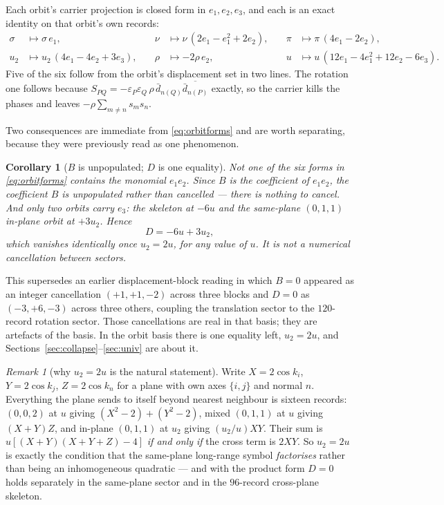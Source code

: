 \documentclass[11pt]{article}
\newtheorem{corollary}[theorem]{Corollary}
\theoremstyle{definition}
\theoremstyle{remark}
\newtheorem{remark}[theorem]{Remark}
\newcommand{\chk}[1]{}
\begin{document}
Each orbit's carrier projection is closed form in $e_1,e_2,e_3$, and each is an
exact identity on that orbit's own records:
\begin{equation}\label{eq:orbitforms}
\begin{aligned}
  \sigma&\longmapsto \sigma\,e_1, &\quad
  \nu&\longmapsto \nu\,(2e_1-e_1^2+2e_2), &\quad
  \pi&\longmapsto \pi\,(4e_1-2e_2),\\
  u_2&\longmapsto u_2\,(4e_1-4e_2+3e_3), &\quad
  \rho&\longmapsto -2\rho\,e_2, &\quad
  u&\longmapsto u\,(12e_1-4e_1^2+12e_2-6e_3).
\end{aligned}
\end{equation}
Five of the six follow from the orbit's displacement set in two lines. The
rotation one follows because
$S_{PQ}=-\varepsilon_P\varepsilon_Q\,\rho\,\bar d_{n(Q)}\overline{\bar d_{n(P)}}$
exactly, so the carrier kills the phases and leaves
$-\rho\sum_{m\ne n}s_ms_n$.\chk{every orbit's carrier projection is closed form in e1, e2, e3}

Two consequences are immediate from \eqref{eq:orbitforms} and are worth
separating, because they were previously read as one phenomenon.

\begin{corollary}[$B$ is unpopulated; $D$ is one equality]\label{cor:bd}
Not one of the six forms in \eqref{eq:orbitforms} contains the monomial
$e_1e_2$. Since $B$ is the coefficient of $e_1e_2$, the coefficient $B$ is
\emph{unpopulated} rather than cancelled --- there is nothing to cancel. And
only two orbits carry $e_3$: the skeleton at $-6u$ and the same-plane $(0,1,1)$
in-plane orbit at $+3u_2$. Hence
\[
  D=-6u+3u_2 ,
\]
which vanishes identically once $u_2=2u$, for \emph{any} value of $u$. It is
not a numerical cancellation between sectors.\chk{the tier collapse is one identity: D = -6u + 3*u2 with u2 = 2u}
\end{corollary}

This supersedes an earlier displacement-block reading in which $B=0$ appeared
as an integer cancellation $(+1,+1,-2)$ across three blocks and $D=0$ as
$(-3,+6,-3)$ across three others, coupling the translation sector to the
$120$-record rotation sector. Those cancellations are real in that basis; they
are artefacts of the basis. In the orbit basis there is one equality left,
$u_2=2u$, and Sections~\ref{sec:collapse}--\ref{sec:univ} are about it.

\begin{remark}[why $u_2=2u$ is the natural statement]
Write $X=2\cos k_i$, $Y=2\cos k_j$, $Z=2\cos k_n$ for a plane with own axes
$\{i,j\}$ and normal $n$. Everything the plane sends to itself beyond nearest
neighbour is sixteen records: $(0,0,2)$ at $u$ giving $(X^2-2)+(Y^2-2)$, mixed
$(0,1,1)$ at $u$ giving $(X+Y)Z$, and in-plane $(0,1,1)$ at $u_2$ giving
$(u_2/u)XY$. Their sum is $u[(X+Y)(X+Y+Z)-4]$ \emph{if and only if} the cross
term is $2XY$. So $u_2=2u$ is exactly the condition that the same-plane
long-range symbol \emph{factorises} rather than being an inhomogeneous
quadratic --- and with the product form $D=0$ holds separately in the
same-plane sector and in the $96$-record cross-plane
skeleton.\chk{u2 = 2u is the cross term of a perfect square}
\end{remark}
\end{document}
